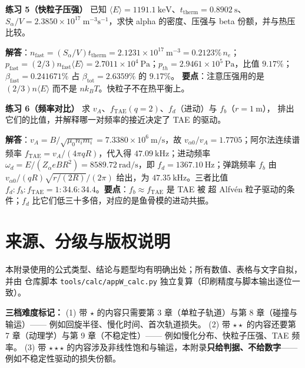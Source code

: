 \textbf{练习 5（快粒子压强）}
已知 $\langle E\rangle=1191.1\ \mathrm{keV}$、$t_{\text{therm}}=0.8902\ \mathrm{s}$、
$S_\alpha/V=2.3850\times10^{17}\ \mathrm{m^{-3}s^{-1}}$，求快 alpha 的密度、压强与
beta 份额，并与热压比较。

\textbf{解答}：$n_{\text{fast}}=(S_\alpha/V)t_{\text{therm}}=2.1231\times10^{17}\ \mathrm{m^{-3}}
=0.2123\%\,n_e$；$p_{\text{fast}}=(2/3)n_{\text{fast}}\langle E\rangle
=2.7011\times10^{4}\ \mathrm{Pa}$；$p_{th}=2.9461\times10^{5}\ \mathrm{Pa}$，比值 $9.17\%$；
$\beta_{\text{fast}}=0.241671\%$ 占 $\beta_{\text{tot}}=2.6359\%$ 的 $9.17\%$。
\textbf{要点}：注意压强用的是 $(2/3)n\langle E\rangle$ 而不是 $nk_BT$。快粒子不在热平衡上。

\textbf{练习 6（频率对比）}
求 $v_A$、$f_{\text{TAE}}(q=2)$、$f_d$（进动）与 $f_b$（$r=1\ \mathrm{m}$），
排出它们的比值，并解释哪一对频率的接近决定了 TAE 的驱动。

\textbf{解答}：$v_A=B/\sqrt{\mu_0n_im_i}=7.3380\times10^{6}\ \mathrm{m/s}$，故
$v_{\alpha 0}/v_A=1.7705$；阿尔法连续谱频率 $f_{\text{TAE}}=v_A/(4\pi qR)$，代入得
$47.09\ \mathrm{kHz}$；进动频率 $\omega_d=E/(Z_\alpha eBR^2)=8589.72\ \mathrm{rad/s}$，即
$f_d=1367.10\ \mathrm{Hz}$；弹跳频率 $f_b$ 由 $v_{\alpha 0}/(qR)\sqrt{r/(2R)}/(2\pi)$
给出，为 $47.35\ \mathrm{kHz}$。三者比值
$f_d:f_b:f_{\text{TAE}}=1:34.6:34.4$。\textbf{要点}：$f_b\approx f_{\text{TAE}}$ 是 TAE 被
超 Alfvén 粒子驱动的条件；$f_d$ 比它们低三十多倍，对应的是鱼骨模的进动共振。

\section{来源、分级与版权说明}
\label{sec:app-w-source}

\begingroup\small
本附录使用的公式类型、结论与题型均有明确出处；所有数值、表格与文字自拟，并由
仓库脚本 \texttt{tools/\allowbreak{}calc/\allowbreak{}appW\_calc.py} 独立复算（印刷精度与脚本输出逐位一致）。

\textbf{三档难度标记：}
(1) 带 $\star$ 的内容只需要第 3 章（单粒子轨道）与第 8 章（碰撞与输运）——
例如回旋半径、慢化时间、首次轨道损失。
(2) 带 $\star\star$ 的内容还要第 7 章（动理学）与第 9 章（不稳定性）——
例如慢化分布、快粒子压强、TAE 频率。
(3) 带 $\star\star\star$ 的内容涉及非线性饱和与输运，本附录\textbf{只给判据、不给数字}——
例如不稳定性驱动的损失份额。

